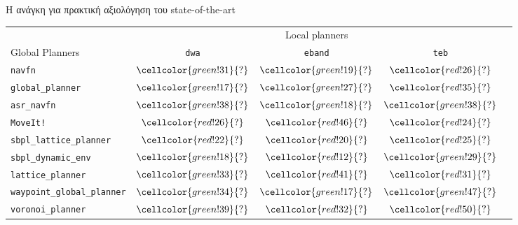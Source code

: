 \begin{frame}{Η ανάγκη για πρακτική αξιολόγηση του state-of-the-art}
{\footnotesize
\begin{table}[h]
\begin{tabular}{lcccc}
  & \multicolumn{3}{c}{Local planners} \\
  \cline{2-4}
  Global Planners                     & \texttt{dwa}                               & \texttt{eband}                             & \texttt{teb} \\ \toprule
  \texttt{navfn}                     & $\cellcolor{green!31}{?}$         & $\cellcolor{green!19}{?}$            & $\cellcolor{red!26}{?}$         \\
  \texttt{global\_planner}           & $\cellcolor{green!17}{?}$         & $\cellcolor{green!27}{?}$            & $\cellcolor{red!35}{?}$         \\
  \texttt{asr\_navfn}                & $\cellcolor{green!38}{?}$         & $\cellcolor{green!18}{?}$            & $\cellcolor{green!38}{?}$         \\
  \texttt{MoveIt!}                   & $\cellcolor{red!26}{?}$         & $\cellcolor{red!46}{?}$            & $\cellcolor{red!24}{?}$         \\
  \texttt{sbpl\_lattice\_planner}    & $\cellcolor{red!22}{?}$         & $\cellcolor{red!20}{?}$            & $\cellcolor{red!25}{?}$         \\
  \texttt{sbpl\_dynamic\_env}        & $\cellcolor{green!18}{?}$         & $\cellcolor{red!12}{?}$            & $\cellcolor{green!29}{?}$         \\
  \texttt{lattice\_planner}          & $\cellcolor{green!33}{?}$         & $\cellcolor{red!41}{?}$            & $\cellcolor{red!31}{?}$         \\
  \texttt{waypoint\_global\_planner} & $\cellcolor{green!34}{?}$         & $\cellcolor{green!17}{?}$            & $\cellcolor{green!47}{?}$         \\
  \texttt{voronoi\_planner}          & $\cellcolor{green!39}{?}$         & $\cellcolor{red!32}{?}$            & $\cellcolor{red!50}{?}$         \\ \bottomrule
\end{tabular}
\end{table}
}

\end{frame}

